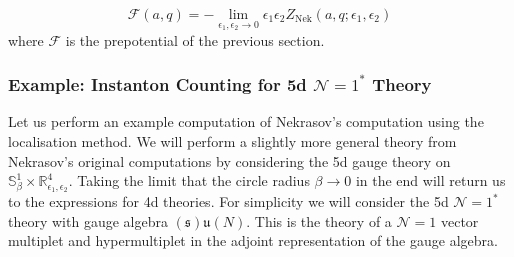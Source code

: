 \documentclass[main.tex]{subfiles}
\begin{document}
\begin{equation}
\mathcal{F}(a,q)=-\lim_{\epsilon_1,\epsilon_2\to0}\epsilon_1\epsilon_2Z_{\text{Nek}}(a,q;\epsilon_1,\epsilon_2)
\end{equation}
where $\mathcal{F}$ is the prepotential of the previous section.

\subsubsection{Example: Instanton Counting for 5d $\mathcal{N}=1^*$ Theory}
Let us perform an example computation of Nekrasov's computation using the localisation method.  We will perform a slightly more general theory from Nekrasov's original computations by considering the 5d gauge theory on $\mathbb{S}^1_{\beta}\times\mathbb{R}^4_{\epsilon_1,\epsilon_2}$.  Taking the limit that the circle radius $\beta\to0$ in the end will return us to the expressions for 4d theories.  For simplicity we will consider the 5d $\mathcal{N}=1^*$ theory with gauge algebra $\mathfrak{(s)u}(N)$.  This is the theory of a $\mathcal{N}=1$ vector multiplet and hypermultiplet in the adjoint representation of the gauge algebra.
\end{document}
